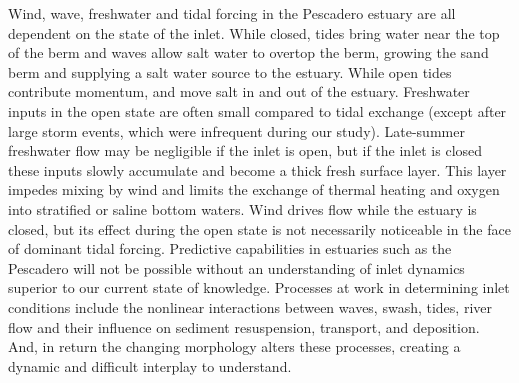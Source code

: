 Wind, wave, freshwater and tidal forcing in the Pescadero estuary are all dependent on the state of the inlet.  While closed, tides bring water near the top of the berm and waves allow salt water to overtop the berm, growing the sand berm and supplying a salt water source to the estuary. While open tides contribute momentum, and move salt in and out of the estuary. Freshwater inputs in the open state are often small compared to tidal exchange (except after large storm events, which were infrequent during our study). Late-summer freshwater flow may be negligible if the inlet is open, but if the inlet is closed these inputs slowly accumulate and become a thick fresh surface layer. This layer impedes mixing by wind and limits the exchange of thermal heating and oxygen into stratified or saline bottom waters. Wind drives flow while the estuary is closed, but its effect during the open state is not necessarily noticeable in the face of dominant tidal forcing. Predictive capabilities in estuaries such as the Pescadero will not be possible without an understanding of inlet dynamics superior to our current state of knowledge.  Processes at work in determining inlet conditions include the nonlinear interactions between waves, swash, tides, river flow and their influence on sediment resuspension, transport, and deposition. And, in return the changing morphology alters these processes, creating a dynamic and difficult interplay to understand. 
